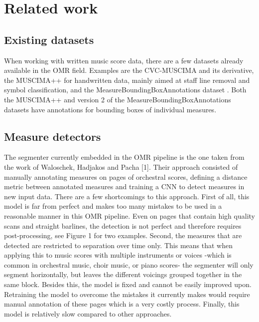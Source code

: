 \chapter{Related work}\label{chap:related-work}


\section{Existing datasets}\label{sec:related-work-existing-datasets}
When working with written music score data, there are a few datasets already available in the OMR field. Examples are the CVC-MUSCIMA \citep{Fornes2012} and its derivative, the MUSCIMA++ \citep{Hajic2017} for handwritten data, mainly aimed at staff line removal and symbol classification, and the MeasureBoundingBoxAnnotations dataset \citep{Zalkow2019}. Both the MUSCIMA++ and version 2 of the MeasureBoundingBoxAnnotations datasets have annotations for bounding boxes of individual measures.

\section{Measure detectors}
The segmenter currently embedded in the OMR pipeline is the one taken from the work of Waloschek, Hadjakos and Pacha [1]. Their approach consisted of manually annotating measures on pages of orchestral scores, defining a distance metric between annotated measures and training a CNN to detect measures in new input data. There are a few shortcomings to this approach. First of all, this model is far from perfect and makes too many mistakes to be used in a reasonable manner in this OMR pipeline. Even on pages that contain high quality scans and straight barlines, the detection is not perfect and therefore requires post-processing, see Figure 1 for two examples. Second, the measures that are detected are restricted to separation over time only. This means that when applying this to music scores with multiple instruments or voices -which is common in orchestral music, choir music, or piano scores- the segmenter will only segment horizontally, but leaves the different voicings grouped together in the same block. Besides this, the model is fixed and cannot be easily improved upon. Retraining the model to overcome the mistakes it currently makes would require manual annotation of these pages which is a very costly process. Finally, this model is relatively slow compared to other approaches. 

